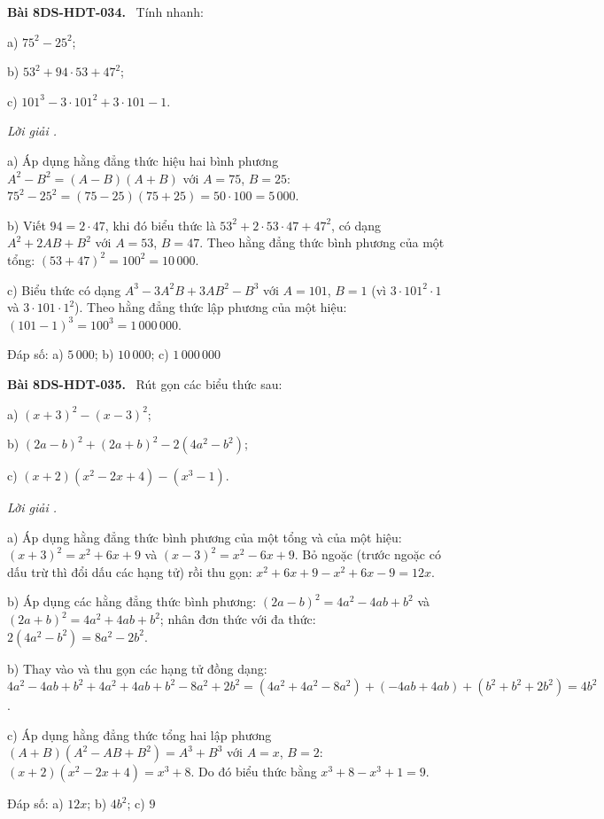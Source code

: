 \documentclass[12pt,a4paper]{article}
\newenvironment{problem}[1][]{\par\medskip\noindent\textbf{Bài #1.}\ }{\par}
\newenvironment{solution}[1][]{\par\noindent\textit{Lời giải #1.}\par}{\par}
\begin{document}
\begin{problem}[8DS-HDT-034]
Tính nhanh:

a) $75^2 - 25^2$;

b) $53^2 + 94 \cdot 53 + 47^2$;

c) $101^3 - 3 \cdot 101^2 + 3 \cdot 101 - 1$.

\begin{solution}
a) Áp dụng hằng đẳng thức hiệu hai bình phương $A^2 - B^2 = (A - B)(A + B)$ với $A = 75$, $B = 25$: $75^2 - 25^2 = (75 - 25)(75 + 25) = 50 \cdot 100 = 5\,000$.

b) Viết $94 = 2 \cdot 47$, khi đó biểu thức là $53^2 + 2 \cdot 53 \cdot 47 + 47^2$, có dạng $A^2 + 2AB + B^2$ với $A = 53$, $B = 47$. Theo hằng đẳng thức bình phương của một tổng: $(53 + 47)^2 = 100^2 = 10\,000$.

c) Biểu thức có dạng $A^3 - 3A^2B + 3AB^2 - B^3$ với $A = 101$, $B = 1$ (vì $3 \cdot 101^2 \cdot 1$ và $3 \cdot 101 \cdot 1^2$). Theo hằng đẳng thức lập phương của một hiệu: $(101 - 1)^3 = 100^3 = 1\,000\,000$.

Đáp số: a) $\boxed{5\,000}$; b) $\boxed{10\,000}$; c) $\boxed{1\,000\,000}$
\end{solution}
\end{problem}

\begin{problem}[8DS-HDT-035]
Rút gọn các biểu thức sau:

a) $(x + 3)^2 - (x - 3)^2$;

b) $(2a - b)^2 + (2a + b)^2 - 2(4a^2 - b^2)$;

c) $(x + 2)(x^2 - 2x + 4) - (x^3 - 1)$.

\begin{solution}
a) Áp dụng hằng đẳng thức bình phương của một tổng và của một hiệu: $(x + 3)^2 = x^2 + 6x + 9$ và $(x - 3)^2 = x^2 - 6x + 9$. Bỏ ngoặc (trước ngoặc có dấu trừ thì đổi dấu các hạng tử) rồi thu gọn: $x^2 + 6x + 9 - x^2 + 6x - 9 = 12x$.

b) Áp dụng các hằng đẳng thức bình phương: $(2a - b)^2 = 4a^2 - 4ab + b^2$ và $(2a + b)^2 = 4a^2 + 4ab + b^2$; nhân đơn thức với đa thức: $2(4a^2 - b^2) = 8a^2 - 2b^2$.

b) Thay vào và thu gọn các hạng tử đồng dạng: $4a^2 - 4ab + b^2 + 4a^2 + 4ab + b^2 - 8a^2 + 2b^2 = (4a^2 + 4a^2 - 8a^2) + (-4ab + 4ab) + (b^2 + b^2 + 2b^2) = 4b^2$.

c) Áp dụng hằng đẳng thức tổng hai lập phương $(A + B)(A^2 - AB + B^2) = A^3 + B^3$ với $A = x$, $B = 2$: $(x + 2)(x^2 - 2x + 4) = x^3 + 8$. Do đó biểu thức bằng $x^3 + 8 - x^3 + 1 = 9$.

Đáp số: a) $\boxed{12x}$; b) $\boxed{4b^2}$; c) $\boxed{9}$
\end{solution}
\end{problem}
\end{document}
